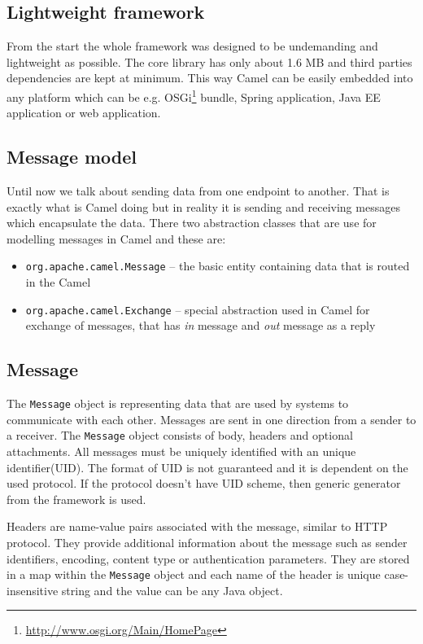 \documentclass[12pt,final,oneside]{fithesis2}
\begin{document}
\subsection*{Lightweight framework}
From the start the whole framework was designed to be undemanding and lightweight as possible. The core library has only about 1.6 MB and third parties dependencies are kept at minimum. This way Camel can be easily embedded into any platform which can be e.g. OSGi\footnote{\url{http://www.osgi.org/Main/HomePage}} bundle, Spring application, Java EE application or web application. 

\subsection{Message model}
Until now we talk about sending data from one endpoint to another. That is exactly what is Camel doing but in reality it is sending and receiving messages which encapsulate the data. There two abstraction classes that are use for modelling messages in Camel and these are:
\begin{itemize}
\item
\texttt{org.apache.camel.Message} -- the basic entity containing data that is routed in the Camel 

\item
\texttt{org.apache.camel.Exchange} -- special abstraction used in Camel for exchange of messages, that has \textit{in} message and \textit{out} message as a reply

\end{itemize} 

\subsection*{Message}
The \texttt{Message} object is representing data that are used by systems to communicate with each other. Messages are sent in one direction from a sender to a receiver. The \texttt{Message} object consists of body, headers and optional attachments. All messages must be uniquely identified with an unique identifier(UID). The format of UID is not guaranteed and it is dependent on the used protocol. If the protocol doesn't have UID scheme, then generic generator from the framework is used.

Headers are name-value pairs associated with the message, similar to HTTP protocol. They provide additional information about the message such as sender identifiers, encoding, content type or authentication parameters. They are stored in a map within the \texttt{Message} object and each name of the header is unique case-insensitive string and the value can be any Java object.
\end{document}

